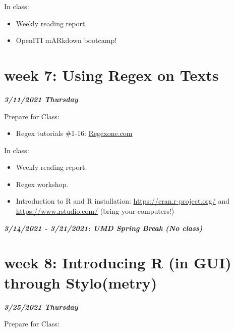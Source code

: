 \documentclass[
]{book}
\providecommand{\tightlist}{%
  \setlength{\itemsep}{0pt}\setlength{\parskip}{0pt}}
\begin{document}
In class:

\begin{itemize}
\tightlist
\item
  Weekly reading report.
\item
  OpenITI mARkdown bootcamp!
\end{itemize}

\hypertarget{week-7-using-regex-on-texts-1}{%
\chapter{week 7: Using Regex on Texts}\label{week-7-using-regex-on-texts-1}}

\textbf{\emph{3/11/2021 Thursday}}

Prepare for Class:

\begin{itemize}
\tightlist
\item
  Regex tutorials \#1-16: \url{Regexone.com}
\end{itemize}

In class:

\begin{itemize}
\tightlist
\item
  Weekly reading report.
\item
  Regex workshop.
\item
  Introduction to R and R installation: \url{https://cran.r-project.org/} and \url{https://www.rstudio.com/} (bring your computers!)
\end{itemize}

\textbf{\emph{3/14/2021 - 3/21/2021: UMD Spring Break (No class)}}

\hypertarget{week-8-introducing-r-in-gui-through-stylometry-1}{%
\chapter{week 8: Introducing R (in GUI) through Stylo(metry)}\label{week-8-introducing-r-in-gui-through-stylometry-1}}

\textbf{\emph{3/25/2021 Thursday}}

Prepare for Class:
\end{document}
